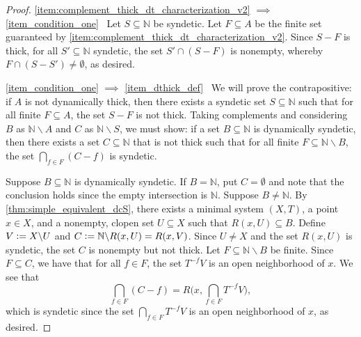 \documentclass[letter,11pt]{article}
\theoremstyle{plain}
\theoremstyle{definition}
\theoremstyle{plain}
\theoremstyle{plain}
\numberwithin{equation}{section}
\newcommand{\N}{\mathbb{N}}
\newcommand{\defeq}{\vcentcolon=}
\renewcommand{\setminus}{\backslash}
\begin{document}
\begin{proof}
    \eqref{item:complement_thick_dt_characterization_v2} $\implies$ \eqref{item_condition_one} \ Let $S \subseteq \N$ be syndetic.  Let $F \subseteq A$ be the finite set guaranteed by \eqref{item:complement_thick_dt_characterization_v2}.  Since $S-F$ is thick, for all $S' \subseteq \N$ syndetic, the set $S' \cap (S-F)$ is nonempty, whereby $F \cap (S-S') \neq \emptyset$, as desired.

    \eqref{item_condition_one} $\implies$ \eqref{item_dthick_def} \ We will prove the contrapositive: if $A$ is not dynamically thick, then there exists a syndetic set $S \subseteq \N$ such that for all finite $F \subseteq A$, the set $S - F$ is not thick. Taking complements and considering $B$ as $\N \setminus A$ and $C$ as $\N \setminus S$, we must show: if a set $B \subseteq \N$ is dynamically syndetic, then there exists a set $C \subseteq \N$ that is not thick such that for all finite $F \subseteq \N \setminus B$, the set $\bigcap_{f \in F} (C - f)$ is syndetic.

    Suppose $B \subseteq \N$ is dynamically syndetic. If $B = \N$, put $C = \emptyset$ and note that the conclusion holds since the empty intersection is $\N$. Suppose $B \neq \N$. By \cref{thm:simple_equivalent_dcS}, there exists a minimal system $(X,T)$, a point $x \in X$, and a nonempty, clopen set $U \subseteq X$ such that $R(x,U) \subseteq B$.  Define $V \defeq X \setminus U$ and $C \defeq \N \setminus R(x,U) = R(x, V)$. Since $U \neq X$ and the set $R(x,U)$ is syndetic, the set $C$ is nonempty but not thick.  Let $F \subseteq \N \setminus B$ be finite.  Since $F \subseteq C$, we have that for all $f \in F$, the set $T^{-f}V$ is an open neighborhood of $x$.  We see that
    \[\bigcap_{f \in F} (C - f) = R\bigg( x, \bigcap_{f \in F}T^{-f}V \bigg),\]
    which is syndetic since the set $\bigcap_{f \in F}T^{-f}V$ is an open neighborhood of $x$, as desired.
\end{proof}
\end{document}
